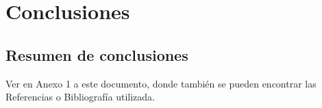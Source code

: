 \documentclass{article}
\begin{document}
\section{Conclusiones}
\subsection{Resumen de conclusiones}
Ver en Anexo 1 a este documento, donde también se pueden encontrar las Referencias o Bibliografía utilizada.











\end{document}
